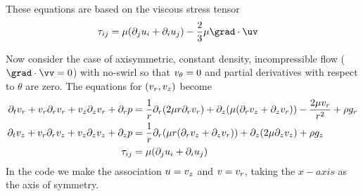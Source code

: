 These equations are based on the viscous stress tensor
\begin{align*}
  \tau_{ij} &= \mu( \partial_j u_i + \partial_i u_j ) - \twoThirds \mu \grad\cdot\uv
\end{align*}


Now consider the case of axisymmetric, constant density, incompressible flow ($\grad\cdot\vv=0$) with
no-swirl so that $v_\theta=0$ and partial derivatives with respect to $\theta$
are zero. The equations for $(v_r,v_z)$ become 
\begin{align}
\partial_t v_r + v_r\partial_r v_r + v_z\partial_z v_r
    + \partial_r p
   &= {1\over r}\partial_r (2 \mu r\partial_r v_r ) + \partial_z( \mu (\partial_r v_z + \partial_z v_r ) )
               - { 2\mu v_r \over r^2} + \rho g_r \\
\partial_t v_z + v_r\partial_r v_z  + v_z\partial_z v_z
     + \partial_z p
    &= {1\over r}\partial_r( \mu r  (\partial_r v_z + \partial_z v_r ) ) 
     + \partial_z( 2 \mu \partial_z v_z )  + \rho g_z \\
   \tau_{ij} &= \mu( \partial_j u_i + \partial_i u_j )
\end{align}
In the code we make the association $u=v_z$ and $v=v_r$, taking the $x-axis$ as the axis of symmetry.
